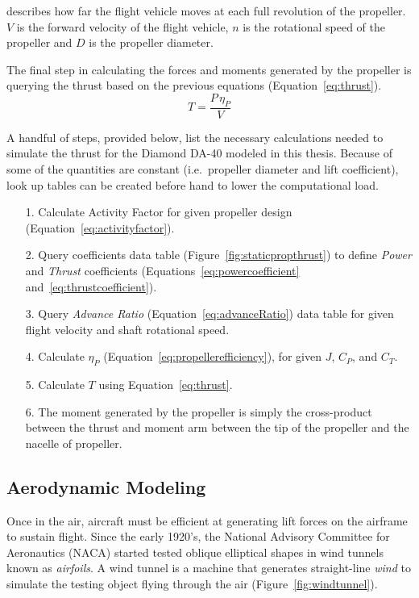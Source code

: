 \documentclass[12pt]{report}
\begin{document}
describes how far the flight vehicle moves at each full revolution of the propeller.
\(V\) is the forward velocity of the flight vehicle, \(n\) is the rotational speed of the propeller and \(D\) is the propeller diameter.

The final step in calculating the forces and moments generated by the propeller is querying the thrust based on the previous equations (Equation~\ref{eq:thrust}).
\begin{equation}\label{eq:thrust}
  T = \frac{P \, \eta_P}{V}
\end{equation}

A handful of steps, provided below, list the necessary calculations needed to simulate the thrust for the Diamond DA-40 modeled in this thesis. Because of some of the quantities are constant (i.e.\ propeller diameter and lift coefficient), look up tables can be created before hand to lower the computational load.

\begin{itemize}
  \item[1.] Calculate Activity Factor for given propeller design (Equation~\ref{eq:activityfactor}).
  \item[2.] Query coefficients data table (Figure~\ref{fig:staticpropthrust}) to define \textit{Power} and \textit{Thrust} coefficients (Equations~\ref{eq:powercoefficient} and~\ref{eq:thrustcoefficient}).
  \item[3.] Query \textit{Advance Ratio} (Equation~\ref{eq:advanceRatio}) data table for given flight velocity and shaft rotational speed.
  \item[4.] Calculate \( \eta_P \) (Equation~\ref{eq:propellerefficiency}), for given \(J\), \(C_P\), and \(C_T\).
  \item[5.] Calculate \(T\) using Equation~\ref{eq:thrust}.
  \item[6.] The moment generated by the propeller is simply the cross-product between the thrust and moment arm between the tip of the propeller and the nacelle of propeller.
\end{itemize}


\clearpage
\subsection{Aerodynamic Modeling}\label{section:aerodynamic}
Once in the air, aircraft must be efficient at generating lift forces on the airframe to sustain flight. Since the early 1920's, the National Advisory Committee for Aeronautics (NACA) started tested oblique elliptical shapes in wind tunnels known as \textit{airfoils}. A wind tunnel is a machine that generates straight-line \textit{wind} to simulate the testing object flying through the air (Figure~\ref{fig:windtunnel}).
\end{document}
